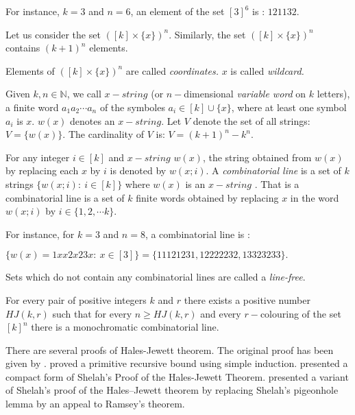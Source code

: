 For instance, $k=3$ and $n=6$, an element of the set $[3]^6$ is : $121132.$

Let us consider the set $([k]\times \{x\})^n.$ Similarly, the set $([k]\times \{x\})^n$ contains $(k+1)^n$ elements.

Elements of $([k]\times \{x\})^n$ are called \textit{coordinates.}
$x$ is called \textit{wildcard.}


Given ${k,n\in{\mathbb N}}$, we call $x-string$ (or ${n}-$dimensional \textit{variable word} on ${k}$ letters),  a finite word $a_1a_2\cdots a_n$ of the symboles $a_i \in [k] \cup \{x\}$, where at least one symbol $a_i$ is $x.$ $w(x)$ denotes an $x-string.$ Let $V$ denote  the set of all strings: $V=\{w(x)\}$. The cardinality of $V$ is: $V=(k+1)^n-k^n.$ 

For any integer $i \in [k]$ and $x-string$ $w(x)$, the string obtained from $w(x)$ by replacing each $x$ by $i$ is denoted by $w(x;i).$ 
A \textit{combinatorial line} is a set of $k$ strings $\{w(x;i): \  i\in [k] \}$ where $w(x)$ is an $x-string$ \citep{beck2008combinatorial}. That is a combinatorial line is a set of $k$ finite words obtained by replacing $x$ in the word $w(x;i)$ by $i \in \{1,2, \cdots k\}.$

For instance, for $k=3$ and $n=8$, a combinatorial line is :

$\{w(x)=1xx2x23x: \ x\in [3]\}=  \{11121231, 12222232, 13323233 \}.$

Sets which do not contain any combinatorial lines are called a \textit{line-free}. 

\begin{thm}   For every pair of positive integers $k$ and $r$ there exists a positive number $HJ(k, r)$ such that for every $n \geq HJ(k, r)$ and every $r-$colouring of the set $[k]^n$ there is a
monochromatic combinatorial line.   \label{hj1} 	\end{thm}

There are several proofs of Hales-Jewett theorem. The original proof has been given by \cite{hales1987regularity}. \cite{shelah1988primitive} proved a primitive recursive bound using simple induction. 
\cite{nilli1990shelah} presented a compact form of Shelah’s Proof of the Hales-Jewett Theorem. \cite{matet2007shelah} presented a variant of Shelah’s proof of the Hales–Jewett theorem by replacing Shelah’s pigeonhole lemma by an appeal to Ramsey’s theorem.

